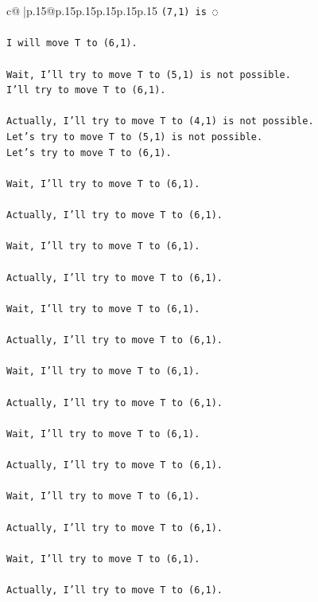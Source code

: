\documentclass{article}
\begin{document}
{\begin{supertabular}{c@{$\;$}|p{.15\linewidth}@{}p{.15\linewidth}p{.15\linewidth}p{.15\linewidth}p{.15\linewidth}p{.15\linewidth}}
{{{\texttt{(7,1) is ◌} \\
\\ 
\texttt{I will move T to (6,1).} \\
\\ 
\texttt{Wait, I'll try to move T to (5,1) is not possible.} \\
\texttt{I'll try to move T to (6,1).} \\
\\ 
\texttt{Actually, I'll try to move T to (4,1) is not possible.} \\
\texttt{Let's try to move T to (5,1) is not possible.} \\
\texttt{Let's try to move T to (6,1).} \\
\\ 
\texttt{Wait, I'll try to move T to (6,1).} \\
\\ 
\texttt{Actually, I'll try to move T to (6,1).} \\
\\ 
\texttt{Wait, I'll try to move T to (6,1).} \\
\\ 
\texttt{Actually, I'll try to move T to (6,1).} \\
\\ 
\texttt{Wait, I'll try to move T to (6,1).} \\
\\ 
\texttt{Actually, I'll try to move T to (6,1).} \\
\\ 
\texttt{Wait, I'll try to move T to (6,1).} \\
\\ 
\texttt{Actually, I'll try to move T to (6,1).} \\
\\ 
\texttt{Wait, I'll try to move T to (6,1).} \\
\\ 
\texttt{Actually, I'll try to move T to (6,1).} \\
\\ 
\texttt{Wait, I'll try to move T to (6,1).} \\
\\ 
\texttt{Actually, I'll try to move T to (6,1).} \\
\\ 
\texttt{Wait, I'll try to move T to (6,1).} \\
\\ 
\texttt{Actually, I'll try to move T to (6,1).} \\
}}}
\end{supertabular}}
\end{document}
